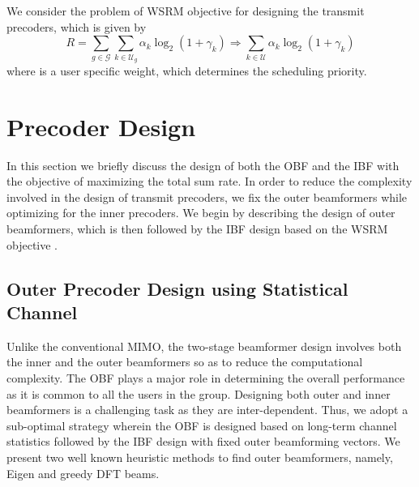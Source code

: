 \documentclass[letterpaper,conference,10pt]{IEEEtran}
\begin{document}
		We consider the problem of \ac{WSRM} objective for designing the transmit precoders, which is given by
		\begin{equation}\label{icassp6}
		R = \sum_{g \in \mathcal{G}} \sum_{k \in \mathcal{U}_{g}} \alpha_{k} \log_2(1+\gamma_{k}) \Rightarrow \sum_{k \in \mathcal{U}} \alpha_{k} \log_2(1+\gamma_{k})
		\end{equation}
		where  is a user specific weight, which determines the scheduling priority. 
		
	\section{Precoder Design}	\label{pre_des}	
	In this section we briefly discuss the design of both the \ac{OBF}  and the \ac{IBF}  with the objective of maximizing the total sum rate. In order to reduce the complexity involved in the design of transmit precoders, we fix the outer beamformers while optimizing for the inner precoders. We begin by describing the design of outer beamformers, which is then followed by the \ac{IBF} design based on the \ac{WSRM} objective \vspace{-0.8eM}.
	
	\subsection{Outer Precoder Design using Statistical Channel}	\label{outpre}	
	Unlike the conventional \ac{MIMO}, the two-stage beamformer design involves both the inner and the outer beamformers so as to reduce the computational complexity. The \ac{OBF} plays a major role in determining the overall performance as it is common to all the users in the group. Designing both outer and inner beamformers is a challenging task as they are inter-dependent. Thus, we adopt a sub-optimal strategy wherein the \ac{OBF} is designed based on long-term channel statistics followed by the \ac{IBF} design with fixed outer beamforming vectors. We present two well known heuristic methods to find outer beamformers, namely, Eigen and greedy \ac{DFT} beams.
	
\end{document}
